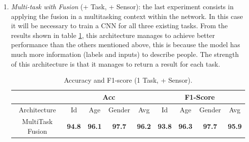\begin{enumerate}
    \item \emph{Multi-task with Fusion} (+ Task, + Sensor): the last experiment consists in applying the fusion in a multitasking context within the network. In this case it will be necessary to train a CNN for all three existing tasks. From the results shown in table \ref{table accuracy and F1 (+ Task, + Sensor)}, this architecture manages to achieve better performance than the others mentioned above, this is because the model has much more information (labels and inputs) to describe people. The strength of this architecture is that it manages to return a result for each task.
    \begin{table}[h!]
        \centering
        \begin{adjustbox}{max width=\textwidth}
        \begin{tabular}{|c||ccc|c||ccc|c|}
            \hline
                & \multicolumn{4}{c||}{Acc} & \multicolumn{4}{c|}{F1-Score} \\
            \hline
                Architecture & Id & Age & Gender & Avg & Id & Age & Gender & Avg\\
            \hline
                MultiTask Fusion & \bfseries{94.8} & \bfseries{96.1} & \bfseries{97.7} & \bfseries{96.2} & \bfseries{93.8} & \bfseries{96.3} & \bfseries{97.7} & \bfseries{95.9}\\
            \hline 
        \end{tabular}
        \end{adjustbox}
        \caption{Accuracy and F1-score (1 Task, + Sensor).}
        \label{table accuracy and F1 (+ Task, + Sensor)}
    \end{table}
\end{enumerate}

